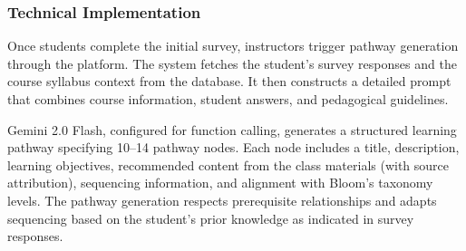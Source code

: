 \documentclass{stylefiles/capstone}
\begin{document}
\begin{figure}[h]
{
}

\end{figure}

\subsubsection{Technical Implementation}

Once students complete the initial survey, instructors trigger pathway generation through the platform. The system fetches the student's survey responses and the course syllabus context from the database. It then constructs a detailed prompt that combines course information, student answers, and pedagogical guidelines.

Gemini 2.0 Flash, configured for function calling, generates a structured learning pathway specifying 10--14 pathway nodes. Each node includes a title, description, learning objectives, recommended content from the class materials (with source attribution), sequencing information, and alignment with Bloom's taxonomy levels. The pathway generation respects prerequisite relationships and adapts sequencing based on the student's prior knowledge as indicated in survey responses.
\end{document}
